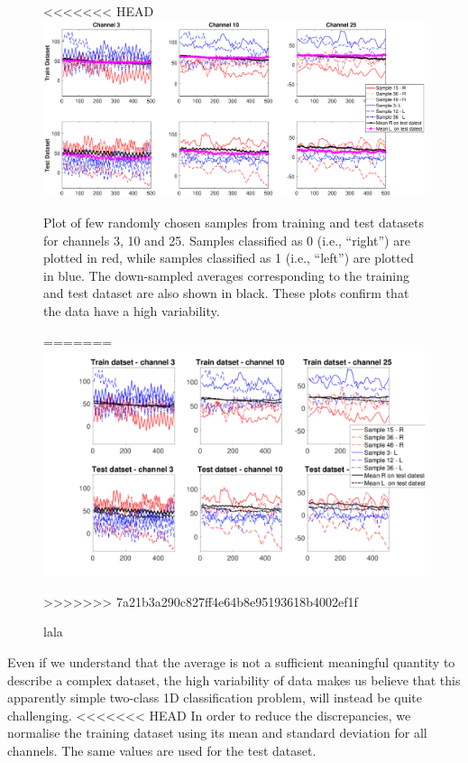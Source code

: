 \documentclass{article}
\begin{document}
  \begin{figure}[h]
 \begin{center}
<<<<<<< HEAD
  \includegraphics[width=1\textwidth]{fig/fig5new_fewsamples_mean_downsampled} 
  \caption{Plot of few randomly chosen samples from training and test datasets for channels 3, 10 and 25.
  Samples classified as 0 (i.e., ``right'') are plotted in red, while   samples classified as 1 (i.e., ``left'') are plotted in blue.
  The down-sampled averages corresponding to the training and test dataset are also shown in black.
   These plots confirm that the data have a high variability. 
  \label{fig_fewsamples_vs_mean_downsampled}}
=======
  \includegraphics[width=1\textwidth]{fig/fig5_fewsamples_mean_downsampled} 
  \caption{lala\label{fig_fewsamples_vs_mean_downsampled}}
>>>>>>> 7a21b3a290c827ff4e64b8e95193618b4002ef1f
  \end{center}
  \end{figure}
  
 Even if we understand that the average is not a sufficient meaningful quantity to describe a complex dataset, the high variability of data makes us believe that this apparently simple two-class 1D classification problem, will instead be quite challenging. 
<<<<<<< HEAD
  In order to reduce the discrepancies, we  normalise the training dataset using its mean and standard deviation for all channels. 
  The same values are used for the test dataset. 
  
\end{document}
